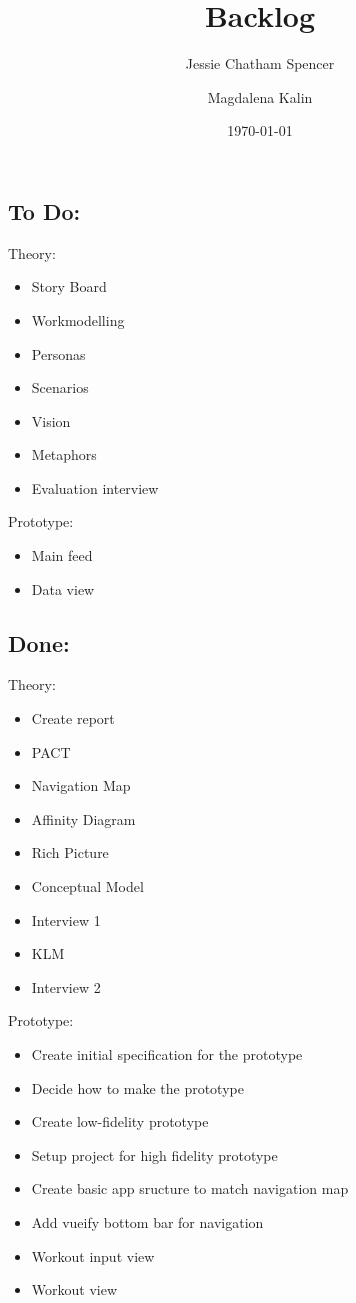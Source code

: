 \documentclass{article}
\title{Backlog}
\author{Jessie Chatham Spencer \and Magdalena Kalin}
\date{\today}
\begin{document}
\maketitle
\subsection*{To Do:}
Theory:
\begin{itemize}
\item Story Board
\item Workmodelling
\item Personas
\item Scenarios
\item Vision
\item Metaphors
\item Evaluation interview
\end{itemize}
Prototype:
\begin{itemize}
\item Main feed
\item Data view
\end{itemize}


\subsection*{Done:}
Theory:
\begin{itemize}
\item Create report
\item PACT 
\item Navigation Map
\item Affinity Diagram
\item Rich Picture
\item Conceptual Model
\item Interview 1
\item KLM
\item Interview 2
\end{itemize}
Prototype:
\begin{itemize}
\item Create initial specification for the prototype
\item Decide how to make the prototype
\item Create low-fidelity prototype
\item Setup project for high fidelity prototype
\item Create basic app sructure to match navigation map
\item Add vueify bottom bar for navigation
\item Workout input view
\item Workout view
\end{itemize}
\end{document}

